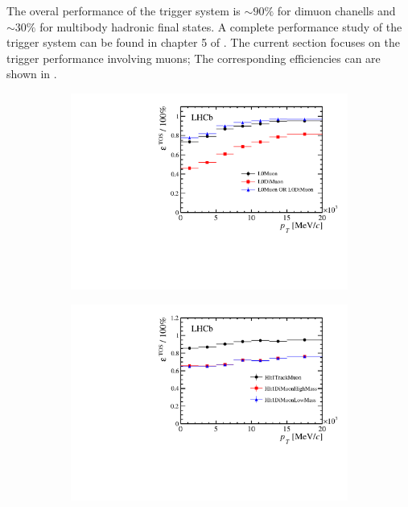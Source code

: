 The overal performance of the \lhcb trigger system is $\sim 90\%$ for dimuon chanells and $\sim 30\%$ for
multibody hadronic final states. A complete performance study of the trigger system can be found in chapter
5 of \cite{Aaij:2014jba}. The current section focuses on the trigger performance involving muons; The corresponding
efficiencies can are shown in .


\begin{figure}[t]
  \centering
  \begin{subfigure}{0.5\textwidth}
    \raggedright
    \includegraphics[width=\textwidth,trim=0.45cm 0cm 0.4cm 0cm, clip=true]{Figures/Chapter2/l0_muon_eff}
    \caption{}
    \label{det_run_one_l0_muon_line_eff}
  \end{subfigure}%
  \begin{subfigure}{0.5\textwidth}
    \raggedleft
    \includegraphics[width=\textwidth,trim=0.45cm 0cm 0.4cm 0cm, clip=true]{Figures/Chapter2/hlt1_muon_eff}

\end{subfigure}
\end{figure}
